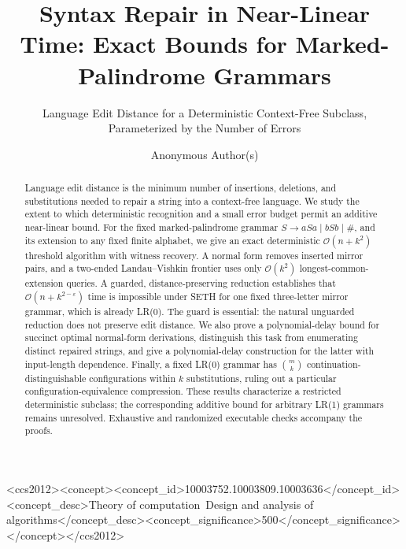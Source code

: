 \documentclass[sigconf,screen]{acmart}
\newcommand{\eps}{\varepsilon}
\newcommand{\Oh}{\mathcal O}
\theoremstyle{definition}
\begin{document}
\title[Syntax Repair in Near-Linear Time]{Syntax Repair in Near-Linear Time: Exact Bounds for Marked-Palindrome Grammars}
\subtitle{Language Edit Distance for a Deterministic Context-Free Subclass, Parameterized by the Number of Errors}
\author{Anonymous Author(s)}
\renewcommand{\shortauthors}{Anonymous Author(s)}

\begin{abstract}
Language edit distance is the minimum number of insertions, deletions, and substitutions needed to repair a string into a context-free language. We study the extent to which deterministic recognition and a small error budget permit an additive near-linear bound. For the fixed marked-palindrome grammar $S\to aSa\mid bSb\mid\#$, and its extension to any fixed finite alphabet, we give an exact deterministic $\Oh(n+k^2)$ threshold algorithm with witness recovery. A normal form removes inserted mirror pairs, and a two-ended Landau--Vishkin frontier uses only $\Oh(k^2)$ longest-common-extension queries. A guarded, distance-preserving reduction establishes that $\Oh(n+k^{2-\eps})$ time is impossible under SETH for one fixed three-letter mirror grammar, which is already LR(0). The guard is essential: the natural unguarded reduction does not preserve edit distance. We also prove a polynomial-delay bound for succinct optimal normal-form derivations, distinguish this task from enumerating distinct repaired strings, and give a polynomial-delay construction for the latter with input-length dependence. Finally, a fixed LR(0) grammar has $\binom{m}{k}$ continuation-distinguishable configurations within $k$ substitutions, ruling out a particular configuration-equivalence compression. These results characterize a restricted deterministic subclass; the corresponding additive bound for arbitrary LR(1) grammars remains unresolved. Exhaustive and randomized executable checks accompany the proofs.
\end{abstract}
\begin{CCSXML}
<ccs2012><concept><concept_id>10003752.10003809.10003636</concept_id><concept_desc>Theory of computation~Design and analysis of algorithms</concept_desc><concept_significance>500</concept_significance></concept></ccs2012>
\end{CCSXML}
\maketitle
\end{document}
